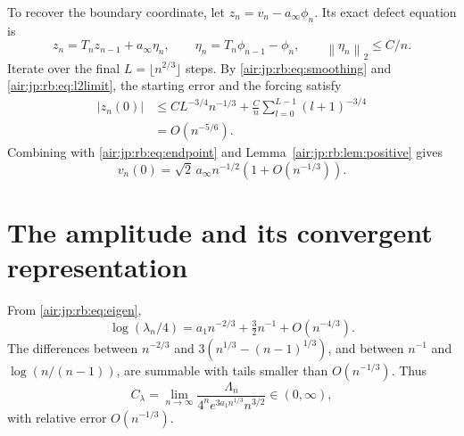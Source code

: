 \documentclass[11pt,letterpaper]{article}
\numberwithin{equation}{section}
\theoremstyle{remark}
\newcommand{\norm}[1]{\left\lVert#1\right\rVert}
\begin{document}
To recover the boundary coordinate, let $z_n=v_n-a_\infty\phi_n$. Its exact defect equation is
\[
 z_n=T_nz_{n-1}+a_\infty\eta_n,\qquad
 \eta_n=T_n\phi_{n-1}-\phi_n,\qquad \norm{\eta_n}_2\le C/n.
\]
Iterate over the final $L=\lfloor n^{2/3}\rfloor$ steps. By \eqref{air:jp:rb:eq:smoothing} and \eqref{air:jp:rb:eq:l2limit}, the starting error and the forcing satisfy
\begin{align*}
 |z_n(0)|
 &\le CL^{-3/4}n^{-1/3}+\frac Cn\sum_{l=0}^{L-1}(l+1)^{-3/4}\\
 &=O(n^{-5/6}).
\end{align*}
Combining with \eqref{air:jp:rb:eq:endpoint} and Lemma~\ref{air:jp:rb:lem:positive} gives
\begin{equation}\label{air:jp:rb:eq:vboundary}
 v_n(0)=\sqrt2\,a_\infty n^{-1/2}\left(1+O(n^{-1/3})\right).
\end{equation}

\section{The amplitude and its convergent representation}\label{air:jp:rb:sec:amplitude}

From \eqref{air:jp:rb:eq:eigen},
\[
 \log(\lambda_n/4)=a_1n^{-2/3}+\tfrac32n^{-1}+O(n^{-4/3}).
\]
The differences between $n^{-2/3}$ and $3(n^{1/3}-(n-1)^{1/3})$, and between $n^{-1}$ and $\log(n/(n-1))$, are summable with tails smaller than $O(n^{-1/3})$. Thus
\begin{equation}\label{air:jp:rb:eq:productlimit}
 C_\lambda=\lim_{n\to\infty}
 \frac{\Lambda_n}{4^ne^{3a_1n^{1/3}}n^{3/2}}\in(0,\infty),
\end{equation}
with relative error $O(n^{-1/3})$.
\end{document}
